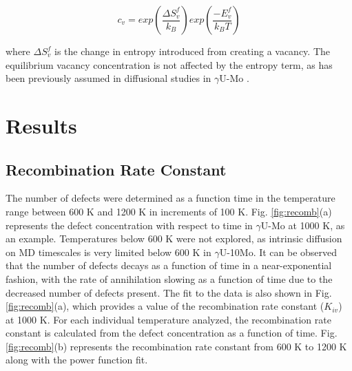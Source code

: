 \documentclass[preprint,12pt]{elsarticle}
\begin{document}
\begin{equation}
\label{eq:surface}
c_{v}=exp\left({\frac{\Delta S_{v}^{f}}{k_{B}}}\right) exp\left({\frac{-E_{v}^{f}}{k_{B}T}}\right)
\end{equation}

\noindent where $\Delta S^{f}_{v}$ is the change in entropy introduced from creating a vacancy. The equilibrium vacancy concentration is not affected by the entropy term, as has been previously assumed in diffusional studies in $\gamma$U-Mo \cite{park2021atomistic, smirnova2015investigation}.

\section{Results}
\subsection{Recombination Rate Constant}\label{sec:recomb}
The number of defects were determined as a function time in the temperature range between 600 K and 1200 K in increments of 100 K. Fig. \ref{fig:recomb}(a) represents the defect concentration with respect to time in $\gamma$U-Mo at 1000 K, as an example. Temperatures below 600 K were not explored, as intrinsic diffusion on MD timescales is very limited below 600 K in $\gamma$U-10Mo.  It can be observed that the number of defects decays as a function of time in a near-exponential fashion, with the rate of annihilation slowing as a function of time due to the decreased number of defects present. The fit to the data is also shown in Fig. \ref{fig:recomb}(a), which provides a value of the recombination rate constant ($K_{iv}$) at 1000 K. For each individual temperature analyzed, the recombination rate constant is calculated from the defect concentration as a function of time. Fig. \ref{fig:recomb}(b) represents the recombination rate constant from 600 K to 1200 K along with the power function fit.\\
\end{document}
